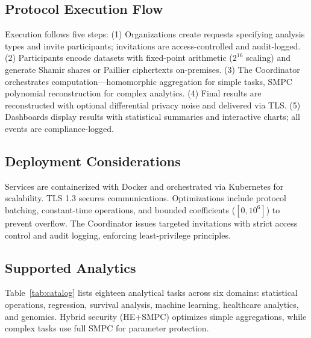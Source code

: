 \documentclass[conference]{IEEEtran}
\begin{document}
\subsection{Protocol Execution Flow}
Execution follows five steps: (1) Organizations create requests specifying analysis types and invite participants; invitations are access-controlled and audit-logged. (2) Participants encode datasets with fixed-point arithmetic ($2^{16}$ scaling) and generate Shamir shares or Paillier ciphertexts on-premises. (3) The Coordinator orchestrates computation—homomorphic aggregation for simple tasks, SMPC polynomial reconstruction for complex analytics. (4) Final results are reconstructed with optional differential privacy noise and delivered via TLS. (5) Dashboards display results with statistical summaries and interactive charts; all events are compliance-logged.

\subsection{Deployment Considerations}
Services are containerized with Docker and orchestrated via Kubernetes for scalability. TLS 1.3 secures communications. Optimizations include protocol batching, constant-time operations, and bounded coefficients ($[0, 10^6]$) to prevent overflow. The Coordinator issues targeted invitations with strict access control and audit logging, enforcing least-privilege principles.

\subsection{Supported Analytics}
Table~\ref{tab:catalog} lists eighteen analytical tasks across six domains: statistical operations, regression, survival analysis, machine learning, healthcare analytics, and genomics. Hybrid security (HE+SMPC) optimizes simple aggregations, while complex tasks use full SMPC for parameter protection.
\end{document}
